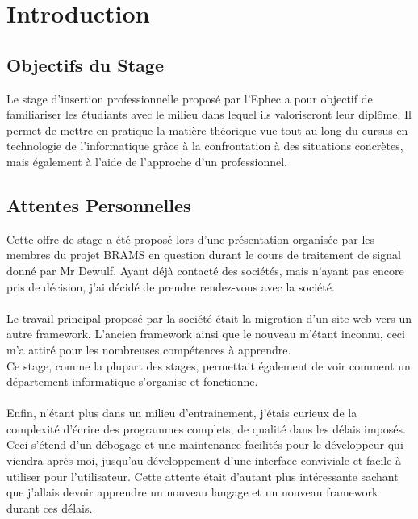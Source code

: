 \documentclass[11pt]{article}
\begin{document}
\newpage

\section{Introduction}

\subsection{Objectifs du Stage}
Le stage d'insertion professionnelle proposé par l'Ephec a pour objectif de familiariser les étudiants avec le milieu dans lequel ils valoriseront leur diplôme.
Il permet de mettre en pratique la matière théorique vue tout au long du cursus en technologie de l'informatique grâce à la confrontation à des situations concrètes, mais également à l'aide de l'approche d'un professionnel.

\subsection{Attentes Personnelles}
Cette offre de stage a été proposé lors d'une présentation organisée par les membres du projet BRAMS en question durant le cours de traitement de signal donné par Mr Dewulf.
Ayant déjà contacté des sociétés, mais n'ayant pas encore pris de décision, j'ai décidé de prendre rendez-vous avec la société.\\
\\
Le travail principal proposé par la société était la migration d'un site web vers un autre framework.
L'ancien framework ainsi que le nouveau m'étant inconnu, ceci m'a attiré pour les nombreuses compétences à apprendre.\\
Ce stage, comme la plupart des stages, permettait également de voir comment un département informatique s'organise et fonctionne.\\
\\
Enfin, n'étant plus dans un milieu d'entrainement, j'étais curieux de la complexité d'écrire des programmes complets, de qualité dans les délais imposés.
Ceci s'étend d'un débogage et une maintenance facilités pour le développeur qui viendra après moi, jusqu'au développement d'une interface conviviale et facile à utiliser pour l'utilisateur.
Cette attente était d'autant plus intéressante sachant que j'allais devoir apprendre un nouveau langage et un nouveau framework durant ces délais.

\newpage
\end{document}
